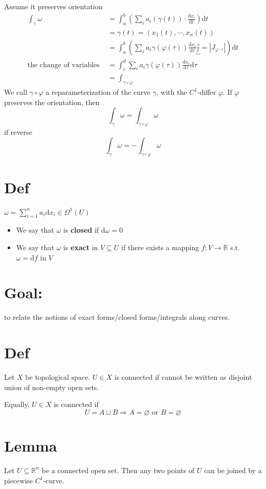 \documentclass{book}
\newcommand{\abs}[1]{\left\lvert #1 \right\rvert}
\begin{document}
Assume it preserves orientation
$$
\begin{aligned}
    \int_\gamma\omega &=\int_a^b\left(\sum\limits_ia_i(\gamma(t))\cdot\frac{\text{d}x_i}{\text{d}t}\right)\text{d}t\\
    &=\gamma(t)=(x_1(t),\cdots,x_n(t))\\
    &=\int_a^b\left(\sum\limits_ia_i\gamma(\varphi(\tau))\frac{\text{d}x_i}{\text{d}\tau}\underbrace{\frac{\tau}t}\limits{=\abs{J_{\varphi^{-1}}}}\right)\text{d}t\\
    \text{the change of variables }&=\int_c^d\sum\limits_ia_i\gamma(\varphi(\tau))\frac{\text{d}x_i}{\text{d}\tau}\text{d}\tau\\
    &=\int_{\gamma\circ\varphi}
\end{aligned}$$
We call $\gamma\circ\varphi$ a reparameterization of the curve $\gamma$, with the $C^1$-differ $\varphi$. If $\varphi$ preserves the orientation, then
$$\int_\gamma\omega=\int_{\gamma\circ\varphi}\omega$$
if reverse
$$\int_\gamma\omega=-\int_{\gamma\circ\varphi}\omega$$
\section{Def}
$\omega=\sum\limits_{i=1}^na_i\text{d}x_i\in\Omega^1(U)$
\begin{itemize}
    \item We say that $\omega$ is \textbf{closed} if $\text{d}\omega=0$
    \item We say that $\omega$ is \textbf{exact} in $V\subseteq U$ if there exists a mapping $f:V\rightarrow\mathbb{R}$ s.t. $\omega=\text{d}f$ in $V$
\end{itemize}
\section*{Goal:}
to relate the notions of exact forms/closed forms/integrals along curves.
\section{Def}
Let $X$ be topological space. $U\in X$ is connected if cannot be written as disjoint union of non-empty open sets.

Equally, $U\in X$ is connected if$$U=A\sqcup B\Rightarrow A=\varnothing\text{ or }B=\varnothing$$ 
\section{Lemma}
\label{Lemma 53.36}
Let $U\subseteq\mathbb{R}^n$ be a connected open set. Then any two points of $U$ can be joined by a piecewise $C^1$-curve.
\end{document}
